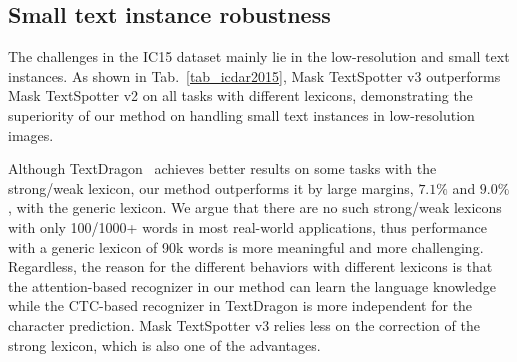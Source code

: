\documentclass[runningheads]{llncs}
\begin{document}
\subsection{Small text instance robustness}
The challenges in the IC15 dataset mainly lie in the low-resolution and small text instances. As shown in Tab.~\ref{tab_icdar2015}, Mask TextSpotter v3 outperforms Mask TextSpotter v2 on all tasks with different lexicons, demonstrating the superiority of our method on handling small text instances in low-resolution images.

Although TextDragon~\cite{TextDragon} achieves better results on some tasks with the strong/weak lexicon, our method outperforms it by large margins, $7.1\%$ and $9.0\%$, with the generic lexicon. We argue that there are no such strong/weak lexicons with only 100/1000+ words in most real-world applications, thus performance with a generic lexicon of 90k words is more meaningful and more challenging. Regardless, the reason for the different behaviors with different lexicons is that the attention-based recognizer in our method can learn the language knowledge while the CTC-based recognizer in TextDragon is more independent for the character prediction. Mask TextSpotter v3 relies less on the correction of the strong lexicon, which is also one of the advantages.
\end{document}
